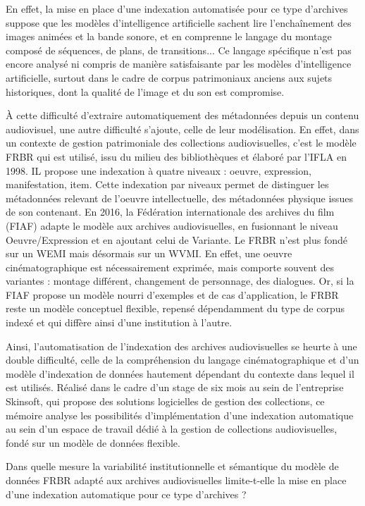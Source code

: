En effet, la mise en place d'une indexation automatisée pour ce type d'archives suppose que les modèles d'intelligence artificielle sachent lire l'enchaînement des images animées et la bande sonore, et en comprenne le langage du montage composé de séquences, de plans, de transitions... Ce langage spécifique n'est pas encore analysé ni compris de manière satisfaisante par les modèles d'intelligence artificielle, surtout dans le cadre de corpus patrimoniaux anciens aux sujets historiques, dont la qualité de l'image et du son est compromise. 
	
À cette difficulté d'extraire automatiquement des métadonnées depuis un contenu audiovisuel, une autre difficulté s'ajoute, celle de leur modélisation. En effet, dans un contexte de gestion patrimoniale des collections audiovisuelles, c'est le modèle FRBR qui est utilisé, issu du milieu des bibliothèques et élaboré par l'IFLA en 1998. IL propose une indexation à quatre niveaux : oeuvre, expression, manifestation, item. Cette indexation par niveaux permet de distinguer les métadonnées relevant de l'oeuvre intellectuelle, des métadonnées physique issues de son contenant. En 2016, la Fédération internationale des archives du film (FIAF) adapte le modèle aux archives audiovisuelles, en fusionnant le niveau Oeuvre/Expression et en ajoutant celui de Variante. Le FRBR n'est plus fondé sur un WEMI mais désormais sur un WVMI. En effet, une oeuvre cinématographique est nécessairement exprimée, mais comporte souvent des variantes : montage différent, changement de personnage, des dialogues. Or, si la FIAF propose un modèle nourri d'exemples et de cas d'application, le FRBR reste un modèle conceptuel flexible, repensé dépendamment du type de corpus indexé et qui diffère ainsi d'une institution à l'autre.
	
	Ainsi, l'automatisation de l'indexation des archives audiovisuelles se heurte à une double difficulté, celle de la compréhension du langage cinématographique et d'un modèle d'indexation de données hautement dépendant du contexte dans lequel il est utilisés. Réalisé dans le cadre d'un stage de six mois au sein de l'entreprise Skinsoft, qui propose des solutions logicielles de gestion des collections, ce mémoire analyse les possibilités d'implémentation d'une indexation automatique au sein d'un espace de travail dédié à la gestion de collections audiovisuelles, fondé sur un modèle de données flexible. 
	
	Dans quelle mesure la variabilité institutionnelle et sémantique du modèle de données FRBR adapté aux archives audiovisuelles limite-t-elle la mise en place d'une indexation automatique pour ce type d'archives ?
	
